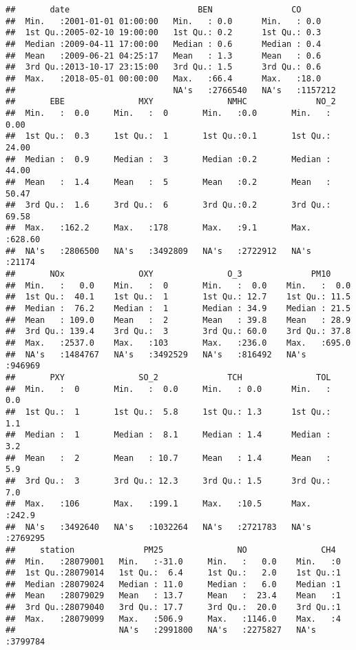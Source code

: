 \documentclass[
]{article}
\begin{document}
\begin{verbatim}
##       date                          BEN                CO         
##  Min.   :2001-01-01 01:00:00   Min.   : 0.0      Min.   : 0.0     
##  1st Qu.:2005-02-10 19:00:00   1st Qu.: 0.2      1st Qu.: 0.3     
##  Median :2009-04-11 17:00:00   Median : 0.6      Median : 0.4     
##  Mean   :2009-06-21 04:25:17   Mean   : 1.3      Mean   : 0.6     
##  3rd Qu.:2013-10-17 23:15:00   3rd Qu.: 1.5      3rd Qu.: 0.6     
##  Max.   :2018-05-01 00:00:00   Max.   :66.4      Max.   :18.0     
##                                NA's   :2766540   NA's   :1157212  
##       EBE               MXY               NMHC              NO_2       
##  Min.   :  0.0     Min.   :  0       Min.   :0.0       Min.   :  0.00  
##  1st Qu.:  0.3     1st Qu.:  1       1st Qu.:0.1       1st Qu.: 24.00  
##  Median :  0.9     Median :  3       Median :0.2       Median : 44.00  
##  Mean   :  1.4     Mean   :  5       Mean   :0.2       Mean   : 50.47  
##  3rd Qu.:  1.6     3rd Qu.:  6       3rd Qu.:0.2       3rd Qu.: 69.58  
##  Max.   :162.2     Max.   :178       Max.   :9.1       Max.   :628.60  
##  NA's   :2806500   NA's   :3492809   NA's   :2722912   NA's   :21174   
##       NOx               OXY               O_3              PM10       
##  Min.   :   0.0    Min.   :  0       Min.   :  0.0    Min.   :  0.0   
##  1st Qu.:  40.1    1st Qu.:  1       1st Qu.: 12.7    1st Qu.: 11.5   
##  Median :  76.2    Median :  1       Median : 34.9    Median : 21.5   
##  Mean   : 109.0    Mean   :  2       Mean   : 39.8    Mean   : 28.9   
##  3rd Qu.: 139.4    3rd Qu.:  3       3rd Qu.: 60.0    3rd Qu.: 37.8   
##  Max.   :2537.0    Max.   :103       Max.   :236.0    Max.   :695.0   
##  NA's   :1484767   NA's   :3492529   NA's   :816492   NA's   :946969  
##       PXY               SO_2              TCH               TOL         
##  Min.   :  0       Min.   :  0.0     Min.   : 0.0      Min.   :  0.0    
##  1st Qu.:  1       1st Qu.:  5.8     1st Qu.: 1.3      1st Qu.:  1.1    
##  Median :  1       Median :  8.1     Median : 1.4      Median :  3.2    
##  Mean   :  2       Mean   : 10.7     Mean   : 1.4      Mean   :  5.9    
##  3rd Qu.:  3       3rd Qu.: 12.3     3rd Qu.: 1.5      3rd Qu.:  7.0    
##  Max.   :106       Max.   :199.1     Max.   :10.5      Max.   :242.9    
##  NA's   :3492640   NA's   :1032264   NA's   :2721783   NA's   :2769295  
##     station              PM25               NO               CH4         
##  Min.   :28079001   Min.   :-31.0     Min.   :   0.0    Min.   :0        
##  1st Qu.:28079014   1st Qu.:  6.4     1st Qu.:   2.0    1st Qu.:1        
##  Median :28079024   Median : 11.0     Median :   6.0    Median :1        
##  Mean   :28079029   Mean   : 13.7     Mean   :  23.4    Mean   :1        
##  3rd Qu.:28079040   3rd Qu.: 17.7     3rd Qu.:  20.0    3rd Qu.:1        
##  Max.   :28079099   Max.   :506.9     Max.   :1146.0    Max.   :4        
##                     NA's   :2991800   NA's   :2275827   NA's   :3799784
\end{verbatim}
\end{document}
